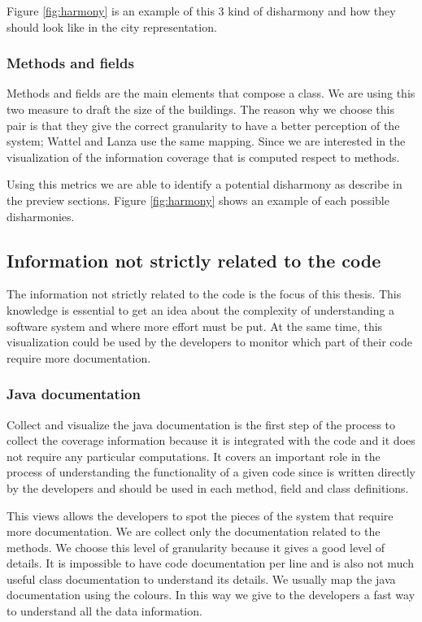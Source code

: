 \documentclass[]{usiinfbachelorproject}
\begin{document}
Figure \ref{fig:harmony} is an example of this 3 kind of disharmony and how they should look like in the city representation.




\subsubsection{Methods  and fields}



Methods and fields are the main elements that compose a class. We are using this two measure to draft the size of the buildings. The reason why we choose this pair is that they give the correct granularity to have a better perception of the system; Wattel and Lanza  \cite{Disharmony,vssac} use the same mapping. Since we are interested in the visualization of the information coverage that is computed respect to  methods. 

Using this metrics we are able to  identify a potential disharmony as describe in the preview sections.
Figure \ref{fig:harmony}  shows an example of each possible disharmonies.
 


    
\newpage
\subsection{Information not strictly related to the code}
The information not strictly related to the code is the focus of this thesis. This knowledge is essential to get an idea about the complexity of understanding a software system and where more effort must be put. At the same time, this visualization could be used by the developers to monitor which part of their code require more documentation.


\subsubsection{Java documentation}
Collect and visualize the java documentation is the first step of the process to collect the coverage information because it is integrated with the code and it does not require any particular computations. It covers an important role in the process of understanding the functionality of a given code since is written directly by the developers and should be used in each method, field and class definitions.

This views allows the developers to spot the pieces of the system that require more documentation. We are collect only the documentation related to the methods. We choose this level of granularity because it gives a good level of details. It is impossible to have code documentation per line and is also not much useful  class documentation to understand its details. 
We usually map the java documentation using the colours. In this way we give to the developers a fast way to understand all the data information. 
\end{document}
